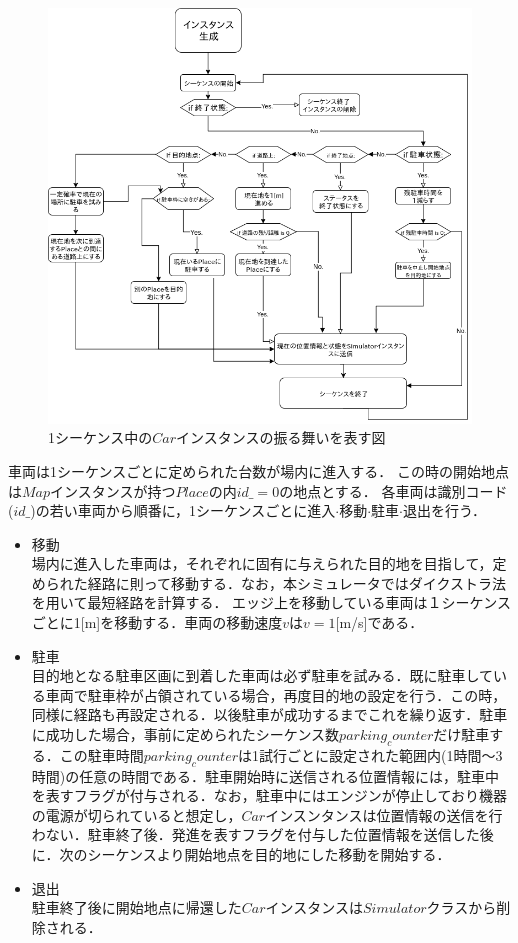 \begin{figure}
	\centering
	\includegraphics[width=14cm]{fig/car-implementation-flow.png}
	\caption{1シーケンス中の$Car$インスタンスの振る舞いを表す図}
	\label{car-implementation-flow}
\end{figure}

車両は1シーケンスごとに定められた台数が場内に進入する．
この時の開始地点は$Map$インスタンスが持つ$Place$の内$id\_=0$の地点とする．
各車両は識別コード($id\_$)の若い車両から順番に，1シーケンスごとに進入$\cdot$移動$\cdot$駐車$\cdot$退出を行う．

\begin{itemize}
	\item 移動 \\
	      場内に進入した車両は，それぞれに固有に与えられた目的地を目指して，定められた経路に則って移動する．なお，本シミュレータではダイクストラ法\cite{Dijkstra}を用いて最短経路を計算する．
	      エッジ上を移動している車両は１シーケンスごとに1[m]を移動する．車両の移動速度$v$は$v=1$[m/s]である．
	\item 駐車 \\
	      目的地となる駐車区画に到着した車両は必ず駐車を試みる．既に駐車している車両で駐車枠が占領されている場合，再度目的地の設定を行う．この時，同様に経路も再設定される．以後駐車が成功するまでこれを繰り返す．駐車に成功した場合，事前に定められたシーケンス数$parking_counter$だけ駐車する．この駐車時間$parking_counter$は1試行ごとに設定された範囲内(1時間〜3時間)の任意の時間である．駐車開始時に送信される位置情報には，駐車中を表すフラグが付与される．なお，駐車中にはエンジンが停止しており機器の電源が切られていると想定し，$Car$インスンタンスは位置情報の送信を行わない．駐車終了後．発進を表すフラグを付与した位置情報を送信した後に．次のシーケンスより開始地点を目的地にした移動を開始する．
	\item 退出 \\
	      駐車終了後に開始地点に帰還した$Car$インスタンスは$Simulator$クラスから削除される．
\end{itemize}

